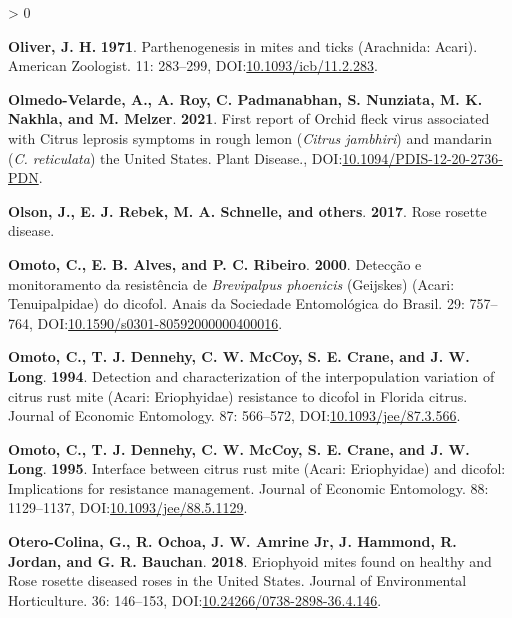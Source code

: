 \documentclass{ufdissertation}[overrideChapters] %
\newlength{\cslhangindent}
\newenvironment{CSLReferences}[2] %
 {%
  \setlength{\parindent}{0pt}
  \ifodd #1 \everypar{\setlength{\hangindent}{\cslhangindent}}\ignorespaces\fi
  \ifnum #2 > 0
  \setlength{\parskip}{#2\baselineskip}
  \fi
 }%
 {}
\begin{document}
{\begin{CSLReferences}{1}{1}
\leavevmode{}%
\textbf{Oliver, J. H.} \textbf{1971}. Parthenogenesis in mites and ticks ({Arachnida}: {Acari}). American Zoologist. 11: 283--299, DOI:\href{https://doi.org/10.1093/icb/11.2.283}{10.1093/icb/11.2.283}.

\leavevmode{}%
\textbf{Olmedo-Velarde, A., A. Roy, C. Padmanabhan, S. Nunziata, M. K. Nakhla, and M. Melzer}. \textbf{2021}. First report of {Orchid fleck virus} associated with {Citrus leprosis} symptoms in rough lemon ({\emph{Citrus jambhiri}}) and mandarin ({\emph{C. reticulata}}) the {United States}. Plant Disease., DOI:\href{https://doi.org/10.1094/PDIS-12-20-2736-PDN}{10.1094/PDIS-12-20-2736-PDN}.

\leavevmode{}%
\textbf{Olson, J., E. J. Rebek, M. A. Schnelle, and others}. \textbf{2017}. Rose rosette disease.

\leavevmode{}%
\textbf{Omoto, C., E. B. Alves, and P. C. Ribeiro}. \textbf{2000}. Detec{ç}{ã}o e monitoramento da resist{ê}ncia de {\emph{Brevipalpus phoenicis}} ({Geijskes}) ({Acari}: {Tenuipalpidae}) do dicofol. Anais da Sociedade Entomol{ó}gica do Brasil. 29: 757--764, DOI:\href{https://doi.org/10.1590/s0301-80592000000400016}{10.1590/s0301-80592000000400016}.

\leavevmode{}%
\textbf{Omoto, C., T. J. Dennehy, C. W. McCoy, S. E. Crane, and J. W. Long}. \textbf{1994}. Detection and characterization of the interpopulation variation of citrus rust mite ({Acari}: {Eriophyidae}) resistance to dicofol in {Florida} citrus. Journal of Economic Entomology. 87: 566--572, DOI:\href{https://doi.org/10.1093/jee/87.3.566}{10.1093/jee/87.3.566}.

\leavevmode{}%
\textbf{Omoto, C., T. J. Dennehy, C. W. McCoy, S. E. Crane, and J. W. Long}. \textbf{1995}. Interface between citrus rust mite ({Acari}: {Eriophyidae}) and dicofol: Implications for resistance management. Journal of Economic Entomology. 88: 1129--1137, DOI:\href{https://doi.org/10.1093/jee/88.5.1129}{10.1093/jee/88.5.1129}.

\leavevmode{}%
\textbf{Otero-Colina, G., R. Ochoa, J. W. Amrine Jr, J. Hammond, R. Jordan, and G. R. Bauchan}. \textbf{2018}. Eriophyoid mites found on healthy and {Rose rosette diseased} roses in the {United States}. Journal of Environmental Horticulture. 36: 146--153, DOI:\href{https://doi.org/10.24266/0738-2898-36.4.146}{10.24266/0738-2898-36.4.146}.


\end{CSLReferences}}
\end{document}
